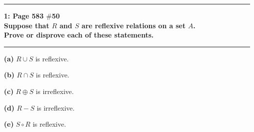 \documentclass[11pt]{article}
\newcommand\question[2]{\vspace{.25in}\hrule\textbf{#1: #2}\vspace{.5em}\hrule\vspace{.10in}}
\renewcommand\part[1]{\vspace{.10in}\textbf{(#1)}}
\begin{document}
\raggedright
\newcommand\NAME{Stewart Dulaney}  %
\newcommand\SID{1545566}     %
\newcommand\HWNUM{9}              %

\question{1}{Page 583 $\#$50\\[\baselineskip]Suppose that $R$ and $S$ are reflexive relations on a set $A$.\\[\baselineskip]Prove or disprove each of these statements.}

\part{a} $R \cup S$ is reflexive.

\part{b} $R \cap S$ is reflexive.

\part{c} $R \oplus S$ is irreflexive.

\part{d} $R - S$ is irreflexive.

\part{e} $S \circ R$ is reflexive.
\end{document}
